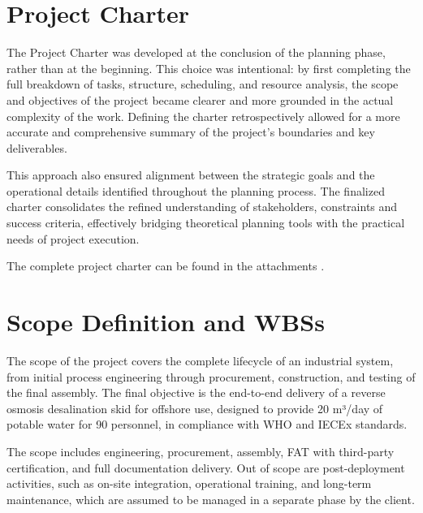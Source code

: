 \section{Project Charter}

The Project Charter was developed at the conclusion of the planning phase, rather than at the beginning. This choice was intentional: by first completing the full breakdown of tasks, structure, scheduling, and resource analysis, the scope and objectives of the project became clearer and more grounded in the actual complexity of the work. Defining the charter retrospectively allowed for a more accurate and comprehensive summary of the project’s boundaries and key deliverables.

This approach also ensured alignment between the strategic goals and the operational details identified throughout the planning process. The finalized charter consolidates the refined understanding of stakeholders, constraints and success criteria, effectively bridging theoretical planning tools with the practical needs of project execution.

The complete project charter can be found in the attachments \cite{ProjectCharter}.

\section{Scope Definition and WBSs}

The scope of the project covers the complete lifecycle of an industrial system, from initial process engineering through procurement, construction, and testing of the final assembly.
The final objective is the end-to-end delivery of a reverse osmosis desalination skid for offshore use, designed to provide 20 m³/day of potable water for 90 personnel, in compliance with WHO and IECEx standards.

The scope includes engineering, procurement, assembly, FAT with third-party certification, and full documentation delivery.
Out of scope are post-deployment activities, such as on-site integration, operational training, and long-term maintenance, which are assumed to be managed in a separate phase by the client.

